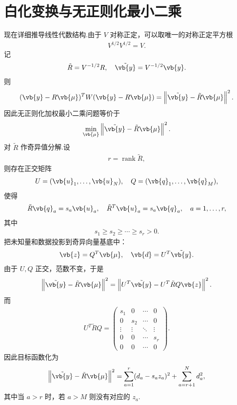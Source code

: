 \section{白化变换与无正则化最小二乘}

现在详细推导线性代数结构.由于 \(V\) 对称正定，可以取唯一的对称正定平方根
\begin{align*}
	V^{1/2}V^{1/2}=V.
\end{align*}
记
\begin{align*}
	\tilde{R}=V^{-1/2}R,\quad
	\tilde{\vb{y}}=V^{-1/2}\vb{y}.
\end{align*}
则
\begin{align*}
	(\vb{y}-R\vb{\mu})^TW(\vb{y}-R\vb{\mu})
	=\left\|\tilde{\vb{y}}-\tilde{R}\vb{\mu}\right\|^2.
\end{align*}
因此无正则化加权最小二乘问题等价于
\begin{align*}
	\min_{\vb{\mu}}\left\|\tilde{\vb{y}}-\tilde{R}\vb{\mu}\right\|^2.
\end{align*}
对 \(\tilde{R}\) 作奇异值分解.设
\begin{align*}
	r=\operatorname{rank}\tilde{R},
\end{align*}
则存在正交矩阵
\begin{align*}
	U=(\vb{u}_1,\ldots,\vb{u}_N),\quad
	Q=(\vb{q}_1,\ldots,\vb{q}_M),
\end{align*}
使得
\begin{align*}
	\tilde{R}\vb{q}_a=s_a\vb{u}_a,\quad
	\tilde{R}^T\vb{u}_a=s_a\vb{q}_a,\quad
	a=1,\ldots,r,
\end{align*}
其中
\begin{align*}
	s_1\geq s_2\geq\cdots\geq s_r>0.
\end{align*}
把未知量和数据投影到奇异向量基底中：
\begin{align*}
	\vb{z}=Q^T\vb{\mu},\quad
	\vb{d}=U^T\tilde{\vb{y}}.
\end{align*}
由于 \(U,Q\) 正交，范数不变，于是
\begin{align*}
	\left\|\tilde{\vb{y}}-\tilde{R}\vb{\mu}\right\|^2
	=\left\|U^T\tilde{\vb{y}}-U^T\tilde{R}Q\vb{z}\right\|^2.
\end{align*}
而
\begin{align*}
	U^T\tilde{R}Q
	=
	\begin{pmatrix}
		s_1 & 0 & \cdots & 0\\
		0 & s_2 & \cdots & 0\\
		\vdots & \vdots & \ddots & \vdots\\
		0 & 0 & \cdots & s_r\\
		0 & 0 & \cdots & 0
	\end{pmatrix}.
\end{align*}
因此目标函数化为
\begin{align*}
	\left\|\tilde{\vb{y}}-\tilde{R}\vb{\mu}\right\|^2
	=\sum_{a=1}^{r}(d_a-s_az_a)^2
	+\sum_{a=r+1}^{N}d_a^2,
\end{align*}
其中当 \(a>r\) 时，若 \(a>M\) 则没有对应的 \(z_a\).

